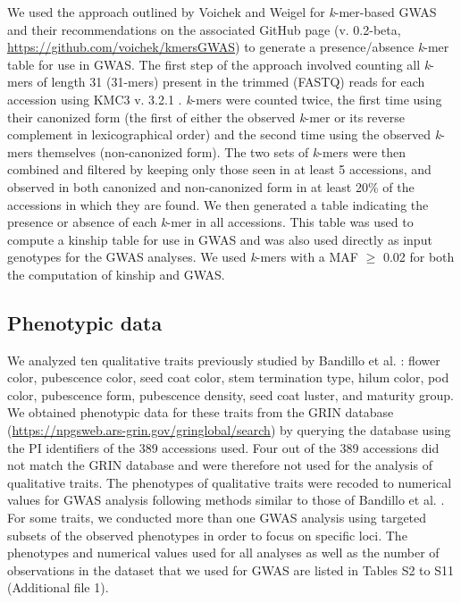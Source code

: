 \documentclass[doublespacing]{bmcart}
\begin{document}
We used the approach outlined by Voichek and Weigel \cite{voichek2020} for \emph{k}-mer-based GWAS
and their recommendations on the
associated GitHub page (v. 0.2-beta, \url{https://github.com/voichek/kmersGWAS}) to generate
a presence/absence \emph{k}-mer table for use in GWAS.  The first step of
the approach involved counting all \emph{k}-mers of length 31 (31-mers) present
in the trimmed (FASTQ) reads for each accession using KMC3 v. 3.2.1
\citep{kokot2017}. \emph{k}-mers were counted twice, the first time using their
canonized form (the first of either the observed \textit{k}-mer or its reverse
complement in lexicographical order) and the second time using the observed
\emph{k}-mers themselves (non-canonized form). The two sets of \textit{k}-mers
were then combined and filtered by
keeping only those seen in at least 5 accessions, and observed in both canonized
and non-canonized form in at least 20\% of the accessions in which they are found.
We then generated a table indicating the presence or absence of each
\emph{k}-mer in all accessions. This table was used to compute a kinship
table for use in GWAS and was also used directly as input genotypes for the
GWAS analyses. We used \emph{k}-mers with a MAF $\geq$ 0.02 for both the
computation of kinship and GWAS.

\subsection*{Phenotypic data}

We analyzed ten qualitative traits previously studied by Bandillo et al. \cite{bandillo2017}: flower
color, pubescence color, seed coat color, stem termination type, hilum color,
pod color, pubescence form, pubescence density, seed coat luster, and maturity
group.  We obtained phenotypic data for these traits from the GRIN database
(\url{https://npgsweb.ars-grin.gov/gringlobal/search}) by querying the database
using the PI identifiers of the 389 accessions used.  Four out of the 389
accessions did not match the GRIN database and were therefore not used for the
analysis of qualitative traits. The phenotypes of qualitative traits were recoded
to numerical values for GWAS analysis following methods similar to those of
Bandillo et al. \cite{bandillo2017}.  For some traits, we conducted more than one GWAS analysis
using targeted subsets of the observed phenotypes in order to focus on specific
loci. The phenotypes and numerical values used for all analyses as well as the
number of observations in the dataset that we used for GWAS are listed in
Tables S2 to S11 (Additional file 1).
\end{document}
